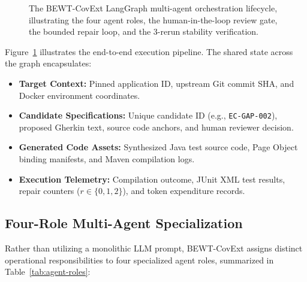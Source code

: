 \documentclass[pdflatex,sn-mathphys-num]{sn-jnl}
\begin{document}
\begin{figure}[t]
{\begin{tikzpicture}
\end{tikzpicture}%
}
\caption{The BEWT-CovExt LangGraph multi-agent orchestration lifecycle, illustrating the four agent roles, the human-in-the-loop review gate, the bounded repair loop, and the 3-rerun stability verification.}\label{fig:framework-lifecycle}
\end{figure}

Figure~\ref{fig:framework-lifecycle} illustrates the end-to-end execution pipeline. The shared state across the graph encapsulates:
\begin{itemize}
    \item \textbf{Target Context:} Pinned application ID, upstream Git commit SHA, and Docker environment coordinates.
    \item \textbf{Candidate Specifications:} Unique candidate ID (e.g., \texttt{EC-GAP-002}), proposed Gherkin text, source code anchors, and human reviewer decision.
    \item \textbf{Generated Code Assets:} Synthesized Java test source code, Page Object binding manifests, and Maven compilation logs.
    \item \textbf{Execution Telemetry:} Compilation outcome, JUnit XML test results, repair counters ($r \in \{0, 1, 2\}$), and token expenditure records.
\end{itemize}

\subsection{Four-Role Multi-Agent Specialization}

Rather than utilizing a monolithic LLM prompt, BEWT-CovExt assigns distinct operational responsibilities to four specialized agent roles, summarized in Table~\ref{tab:agent-roles}:
\end{document}
